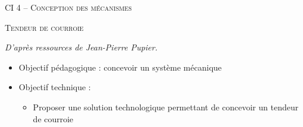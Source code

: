 \documentclass[11pt,oneside]{article}
\begin{document}
\pagestyle{fancy}
\renewcommand{\headrulewidth}{0pt}

\fancyhead{}

\fancyhead[C]{\rule{11cm}{.5pt}}


\renewcommand{\footrulewidth}{0.2pt}

\fancyfoot[C]{\footnotesize{\bfseries \thepage}}




\begin{center}
 \Large\textsc{CI 4 -- Conception des mécanismes}
\end{center}


\begin{center}
 \large\textsc{Tendeur de courroie}
\end{center}
\vspace{.5cm}

\begin{flushright}
\textit{D'après ressources de Jean-Pierre Pupier.}
\end{flushright}

\begin{contexte}
\begin{itemize}
\item Objectif pédagogique : concevoir un système mécanique
\item Objectif technique : 
\begin{itemize}
\item Proposer une solution technologique permettant de concevoir un tendeur de courroie
\end{itemize}
\end{itemize}
\end{contexte}
\end{document}
